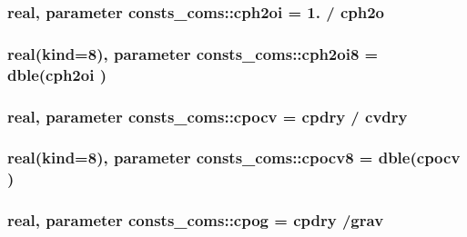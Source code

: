 \subsubsection[{\texorpdfstring{cph2oi}{cph2oi}}]{\setlength{\rightskip}{0pt plus 5cm}real, parameter consts\+\_\+coms\+::cph2oi = 1. / {\bf cph2o}}\hypertarget{namespaceconsts__coms_a060b8a4312550437cd56f415d22df8a1}{}\label{namespaceconsts__coms_a060b8a4312550437cd56f415d22df8a1}
\subsubsection[{\texorpdfstring{cph2oi8}{cph2oi8}}]{\setlength{\rightskip}{0pt plus 5cm}real(kind=8), parameter consts\+\_\+coms\+::cph2oi8 = dble({\bf cph2oi} )}\hypertarget{namespaceconsts__coms_ab6e3f79e0fef1414f52ea43de9f00a3f}{}\label{namespaceconsts__coms_ab6e3f79e0fef1414f52ea43de9f00a3f}
\subsubsection[{\texorpdfstring{cpocv}{cpocv}}]{\setlength{\rightskip}{0pt plus 5cm}real, parameter consts\+\_\+coms\+::cpocv = {\bf cpdry} / {\bf cvdry}}\hypertarget{namespaceconsts__coms_a10b826bdb7e44b4a026e2a0cd1b1d8eb}{}\label{namespaceconsts__coms_a10b826bdb7e44b4a026e2a0cd1b1d8eb}
\subsubsection[{\texorpdfstring{cpocv8}{cpocv8}}]{\setlength{\rightskip}{0pt plus 5cm}real(kind=8), parameter consts\+\_\+coms\+::cpocv8 = dble({\bf cpocv} )}\hypertarget{namespaceconsts__coms_ad09967d9168fbeb34c7fa360442184b5}{}\label{namespaceconsts__coms_ad09967d9168fbeb34c7fa360442184b5}
\subsubsection[{\texorpdfstring{cpog}{cpog}}]{\setlength{\rightskip}{0pt plus 5cm}real, parameter consts\+\_\+coms\+::cpog = {\bf cpdry} /{\bf grav}}\hypertarget{namespaceconsts__coms_ad0da87258bfa78139a0358ed21b77d34}{}\label{namespaceconsts__coms_ad0da87258bfa78139a0358ed21b77d34}
